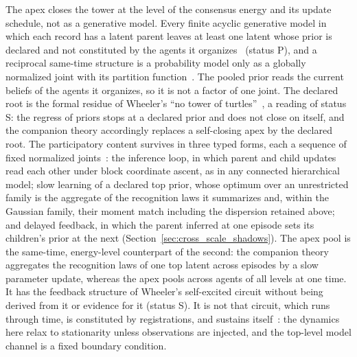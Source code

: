 \documentclass[11pt]{article}
\begin{document}
The apex closes the tower at the level of the consensus energy and its update schedule, not as a generative model. Every finite acyclic generative model in which each record has a latent parent leaves at least one latent whose prior is declared and not constituted by the agents it organizes~\cite[Ch.~12, the declared-root proposition]{DennisGaugeVFE2026} (status P), and a reciprocal same-time structure is a probability model only as a globally normalized joint with its partition function~\cite[Ch.~4]{DennisGaugeVFE2026}. The pooled prior reads the current beliefs of the agents it organizes, so it is not a factor of one joint. The declared root is the formal residue of Wheeler's ``no tower of turtles''~\cite{Wheeler1990}, a reading of status S: the regress of priors stops at a declared prior and does not close on itself, and the companion theory accordingly replaces a self-closing apex by the declared root. The participatory content survives in three typed forms, each a sequence of fixed normalized joints~\cite[Ch.~12]{DennisGaugeVFE2026}: the inference loop, in which parent and child updates read each other under block coordinate ascent, as in any connected hierarchical model; slow learning of a declared top prior, whose optimum over an unrestricted family is the aggregate of the recognition laws it summarizes and, within the Gaussian family, their moment match including the dispersion retained above; and delayed feedback, in which the parent inferred at one episode sets its children's prior at the next (Section~\ref{sec:cross_scale_shadows}). The apex pool is the same-time, energy-level counterpart of the second: the companion theory aggregates the recognition laws of one top latent across episodes by a slow parameter update, whereas the apex pools across agents of all levels at one time. It has the feedback structure of Wheeler's self-excited circuit without being derived from it or evidence for it (status S). It is not that circuit, which runs through time, is constituted by registrations, and sustains itself~\cite{Wheeler1983}: the dynamics here relax to stationarity unless observations are injected, and the top-level model channel is a fixed boundary condition.
\end{document}
